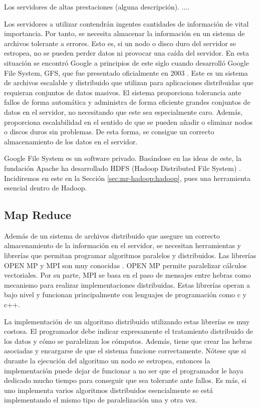 \documentclass[10pt]{article}
\begin{document}
		Los servidores de altas prestaciones (alguna descripción). .... 
		
		Los servidores a utilizar contendrán ingentes cantidades de información de vital importancia. Por tanto, se necesita almacenar la información en un sistema de archivos tolerante a errores. Esto es, si un nodo o disco duro del servidor se estropea, no se pueden perder datos ni provocar una caída del servidor. En esta situación se encontró Google a principios de este siglo cuando desarrolló Google File System, GFS, que fue presentado oficialmente en 2003 \cite{gfs}. Este es un sistema de archivos escalable y distribuido que utilizan para aplicaciones distribuidas que requieran conjuntos de datos masivos. El sistema proporciona tolerancia ante fallos de forma automática y administra de forma eficiente grandes conjuntos de datos en el servidor, no necesitando que este sea especialmente caro. Además, proporciona escalabilidad en el sentido de que se pueden añadir o eliminar nodos o discos duros sin problemas. De esta forma, se consigue un correcto almacenamiento de los datos en el servidor.
		
		Google File System es un software privado. Basándose en las ideas de este, la fundación Apache ha desarrollado HDFS (Hadoop Distributed File System) \cite{hdfs}. Incidiremos en este en la Sección \ref{sec:mr-hadoop:hadoop}, pues una herramienta esencial dentro de Hadoop.				

	\subsection{Map Reduce} \label{sec:mr-hadoop:map-reduce}

		Además de un sistema de archivos distribuido que asegure un correcto almacenamiento de la información en el servidor, se necesitan herramientas y librerías que permitan programar algoritmos paralelos y distribuidos. Las librerías OPEN MP y MPI son muy conocidas \cite{openmpmpi}. OPEN MP permite paralelizar cálculos vectoriales. Por su parte, MPI se basa en el paso de mensajes entre hebras como mecanismo para realizar implementaciones distribuidas. Estas librerías operan a bajo nivel y funcionan principalmente con lenguajes de programación como c y c++. 
		
		La implementación de un algoritmo distribuido utilizando estas librerías es muy costosa. El programador debe indicar expresamente el tratamiento distribuido de los datos y cómo se paralelizan los cómputos. Además, tiene que crear las hebras asociadas y encargarse de que el sistema funcione correctamente. Nótese que si durante la ejecución del algoritmo un nodo se estropea, entonces la implementación puede dejar de funcionar a no ser que el programador le haya dedicado mucho tiempo para conseguir que sea tolerante ante fallos. Es más, si uno implementa varios algoritmos distribuidos esencialmente se está implementando el mismo tipo de paralelización una y otra vez.
	
\end{document}
